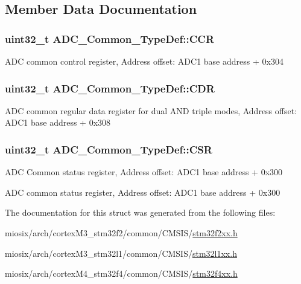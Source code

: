 \subsection{Member Data Documentation}
\hypertarget{struct_a_d_c___common___type_def_aee6d4af7571a1bad2fec9e7b53733277}{
\subsubsection[{C\-C\-R}]{ uint32\-\_\-t A\-D\-C\-\_\-\-Common\-\_\-\-Type\-Def\-::\-C\-C\-R}}\label{struct_a_d_c___common___type_def_aee6d4af7571a1bad2fec9e7b53733277}
A\-D\-C common control register, Address offset\-: A\-D\-C1 base address + 0x304 \hypertarget{struct_a_d_c___common___type_def_a6f7399bf70f677ef5de46a3038f414e1}{
\subsubsection[{C\-D\-R}]{ uint32\-\_\-t A\-D\-C\-\_\-\-Common\-\_\-\-Type\-Def\-::\-C\-D\-R}}\label{struct_a_d_c___common___type_def_a6f7399bf70f677ef5de46a3038f414e1}
A\-D\-C common regular data register for dual A\-N\-D triple modes, Address offset\-: A\-D\-C1 base address + 0x308 \hypertarget{struct_a_d_c___common___type_def_ac38e24f600f9e134a54a0c43b976a4f4}{
\subsubsection[{C\-S\-R}]{ uint32\-\_\-t A\-D\-C\-\_\-\-Common\-\_\-\-Type\-Def\-::\-C\-S\-R}}\label{struct_a_d_c___common___type_def_ac38e24f600f9e134a54a0c43b976a4f4}
A\-D\-C Common status register, Address offset\-: A\-D\-C1 base address + 0x300

A\-D\-C common status register, Address offset\-: A\-D\-C1 base address + 0x300 

The documentation for this struct was generated from the following files\-:\begin{DoxyCompactItemize}
\item 
miosix/arch/cortex\-M3\-\_\-stm32f2/common/\-C\-M\-S\-I\-S/\hyperlink{stm32f2xx_8h}{stm32f2xx.\-h}\item 
miosix/arch/cortex\-M3\-\_\-stm32l1/common/\-C\-M\-S\-I\-S/\hyperlink{stm32l1xx_8h}{stm32l1xx.\-h}\item 
miosix/arch/cortex\-M4\-\_\-stm32f4/common/\-C\-M\-S\-I\-S/\hyperlink{stm32f4xx_8h}{stm32f4xx.\-h}\end{DoxyCompactItemize}
